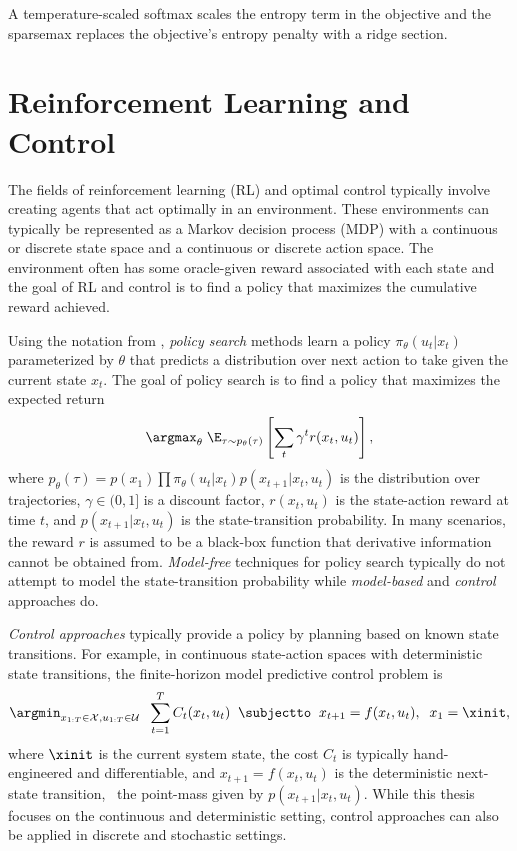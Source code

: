 \begin{corollary}
A temperature-scaled softmax scales the entropy term in the objective
and the sparsemax \citep{martins2016softmax} replaces the
objective's entropy penalty with a ridge section.
\end{corollary}

\newpage
\section{Reinforcement Learning and Control}
\label{sec:bg:rl}

The fields of reinforcement learning (RL) and optimal control
typically involve creating agents that act optimally
in an environment.
These environments can typically be represented
as a Markov decision process (MDP) with a continuous
or discrete state space and a continuous or discrete action space.
The environment often has some oracle-given
reward associated with each state and the goal of RL
and control is to find a policy that maximizes the
cumulative reward achieved.

Using the notation from \citep{levine2017introduction},
\emph{policy search} methods learn a policy $\pi_\theta(u_t|x_t)$
parameterized by $\theta$ that predicts a distribution over next
action to take given the current state $x_t$.
The goal of policy search is to find a policy that maximizes the
expected return
\begin{equation}
  \argmax_\theta\; \E_{\tau\sim p_\theta(\tau)} \left[ \sum_t \gamma^t r(x_t, u_t) \right],
\end{equation}
where $p_\theta(\tau)=p(x_1)\prod\pi_\theta(u_t|x_t)p(x_{t+1}|x_t,u_t)$
is the distribution over trajectories,
$\gamma\in(0,1]$ is a discount factor,
$r(x_t, u_t)$ is the state-action reward at time $t$,
and $p(x_{t+1}|x_t,u_t)$ is the state-transition probability.
In many scenarios, the reward $r$ is assumed to be
a black-box function that derivative information cannot
be obtained from.
\emph{Model-free} techniques for policy search typically do
not attempt to model the state-transition probability
while \emph{model-based} and \emph{control} approaches do.

\emph{Control approaches} typically provide a policy
by planning based on known state transitions.
For example, in continuous state-action spaces with deterministic
state transitions, the finite-horizon model predictive control problem is
\begin{equation}
    \argmin_{x_{1:T} \in \mathcal{X},u_{1:T}\in \mathcal{U}} \;\; \sum_{t=1}^T  C_t(x_t, u_t)
    \;\; \subjectto \;\; x_{t+1} = f(x_t, u_t), \;\; x_1 = \xinit,
\end{equation}
where $\xinit$ is the current system state,
the cost $C_t$ is typically hand-engineered and differentiable,
and $x_{t+1}=f(x_t, u_t)$ is the deterministic
next-state transition, \ie~the point-mass given by $p(x_{t+1}|x_t,u_t)$.
While this thesis focuses on the continuous and deterministic setting,
control approaches can also be applied in discrete
and stochastic settings.

